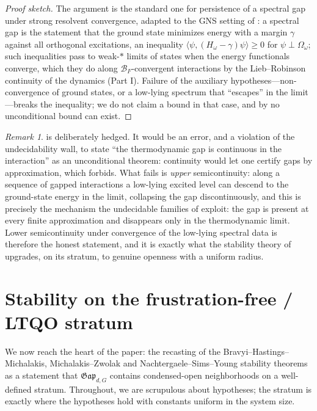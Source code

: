 \documentclass[12pt]{article}
\newcommand{\BF}{\mathcal{B}_{F}}              %
\newcommand{\Gap}{\mathfrak{Gap}}              %
\newcommand{\ip}[1]{\langle #1 \rangle}
\theoremstyle{plain}
\theoremstyle{definition}
\theoremstyle{remark}
\newtheorem{remark}[remark]{Remark}
\begin{document}
\begin{proof}[Proof sketch]
The argument is the standard one for persistence of a spectral gap under strong
resolvent convergence, adapted to the GNS setting of \cite{nsy-bulkgap}: a spectral
gap is the statement that the ground state minimizes energy with a margin
$\gamma$ against all orthogonal excitations, an inequality
$\ip{\psi,(H_\omega-\gamma)\psi}\ge 0$ for $\psi\perp\Omega_\omega$; such inequalities
pass to weak-$*$ limits of states when the energy functionals converge, which they do
along $\BF$-convergent interactions by the Lieb--Robinson continuity of the dynamics
(Part I)\@. Failure of the auxiliary hypotheses---non-convergence of ground states, or
a low-lying spectrum that ``escapes'' in the limit---breaks the inequality; we do not
claim a bound in that case, and by  no unconditional bound can
exist.
\end{proof}

\begin{remark}
\label{rem:lsc-caveat}
 is deliberately hedged. It would be an error, and a violation of the
undecidability wall, to state ``the thermodynamic gap is continuous in the
interaction'' as an unconditional theorem: continuity would let one certify gaps by
approximation, which  forbids. What fails is \emph{upper}
semicontinuity: along a sequence of gapped interactions a low-lying excited level can
descend to the ground-state energy in the limit, collapsing the gap discontinuously,
and this is precisely the mechanism the undecidable families of \cite{cpw-undecidable}
exploit: the gap is present at every finite approximation and disappears only in the
thermodynamic limit. Lower semicontinuity under convergence of the low-lying spectral
data is therefore the honest statement, and it is exactly what the stability theory of
 upgrades, on its stratum, to genuine openness with a uniform
radius.
\end{remark}

\section{Stability on the frustration-free / LTQO stratum}
\label{sec:stability}

We now reach the heart of the paper: the recasting of the
Bravyi--Hastings--Michalakis, Michalakis--Zwolak and Nachtergaele--Sims--Young
stability theorems as a statement that $\Gap_{d,G}$ contains condensed-open
neighborhoods on a well-defined stratum. Throughout, we are scrupulous about
hypotheses; the stratum is exactly where the hypotheses hold with constants uniform
in the system size.
\end{document}
